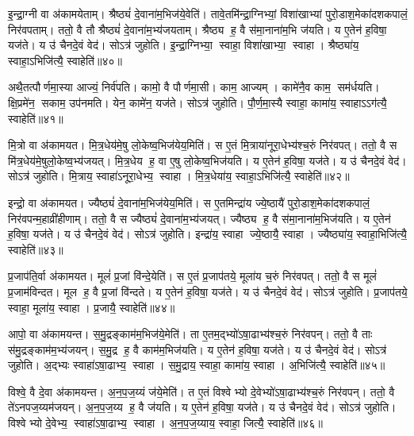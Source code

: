 इ॒न्द्रा॒ग्नी वा अ॑कामयेताम्।
श्रैष्ठ्यं॑ दे॒वाना॑म॒भिज॑ये॒वेति॑।
तावे॒तमि॑न्द्रा॒ग्निभ्यां॒ विशा॑खाभ्यां पुरो॒डाश॒मेका॑दशकपालं॒ निर॑वपताम्।
ततो॒ वै तौ श्रैष्ठ्यं॑ दे॒वाना॑म॒भ्य॑जयताम्।
श्रैष्ठ्य ह॒ वै स॑मा॒नाना॑म॒भि ज॑यति।
य ए॒तेन॑ ह॒विषा॒ यज॑ते।
य उ॑ चैनदे॒वं वेद॑।
सोऽत्र॑ जुहोति।
इ॒न्द्रा॒ग्निभ्या॒ स्वाहा॒ विशा॑खाभ्या॒ स्वाहा।
श्रैष्ठ्या॑य॒ स्वाहा॒ऽभिजि॑त्यै॒ स्वाहेति॑॥४०॥

अथै॒तत्पौर्णमा॒स्या आज्यं॒ निर्व॑पति।
कामो॒ वै पौर्णमा॒सी।
काम॒ आज्यम्।
कामे॑नै॒व काम॒ सम॑र्धयति।
क्षि॒प्रमे॑न॒ सकाम॒ उप॑नमति।
येन॒ कामे॑न॒ यज॑ते।
सोऽत्र॑ जुहोति।
पौ॒र्ण॒मा॒स्यै स्वाहा॒ कामा॑य॒ स्वाहाऽऽग॑त्यै॒ स्वाहेति॑॥४१॥\anuvakamend[अ॒ग्निः पञ्च॑दश प्र॒जाप॑ति॒ष्षोड॑श॒ सोम॒ एका॑दश रु॒द्रो दश॒र्क्षैका॑दश॒ बृह॒स्पति॒र्दश॑ देवासु॒रा नव॑ पि॒तर॒ एका॑दशार्य॒मा भगो॒ दश॑ दश सवि॒ता चतु॑र्दश॒ त्वष्टा॑ वा॒युरि॑न्द्रा॒ग्नी दश॑ द॒शाथै॒तत्पौर्णमा॒स्या अ॒ष्टौ पञ्च॑दश]

मि॒त्रो वा अ॑कामयत।
मि॒त्र॒धेय॑मे॒षु लो॒केष्व॒भिज॑येय॒मिति॑।
स ए॒तं मि॒त्राया॑नूरा॒धेभ्य॑श्च॒रुं निर॑वपत्।
ततो॒ वै स मि॑त्र॒धेय॑मे॒षुलो॒केष्व॒भ्य॑जयत्।
मि॒त्र॒धेय ह॒ वा ए॒षु लो॒केष्व॒भिज॑यति।
य ए॒तेन॑ ह॒विषा॒ यज॑ते।
य उ॑ चैनदे॒वं वेद॑।
सोऽत्र॑ जुहोति।
मि॒त्राय॒ स्वाहा॑ऽनूरा॒धेभ्य॒ स्वाहा।
मि॒त्र॒धेया॑य॒ स्वाहा॒ऽभिजि॑त्यै॒ स्वाहेति॑॥४२॥

इन्द्रो॒ वा अ॑कामयत।
ज्यैष्ठ्यं॑ दे॒वाना॑म॒भिज॑येय॒मिति॑।
स ए॒तमिन्द्रा॑य ज्ये॒ष्ठायै॑ पुरो॒डाश॒मेका॑दशकपालं॒ निर॑वपन्म॒हाव्री॑हीणाम्।
ततो॒ वै स ज्यैष्ठ्यं॑ दे॒वाना॑म॒भ्य॑जयत्।
ज्यैष्ठ्य ह॒ वै स॑मा॒नाना॑म॒भिज॑यति।
य ए॒तेन॑ ह॒विषा॒ यज॑ते।
य उ॑ चैनदे॒वं वेद॑।
सोऽत्र॑ जुहोति।
इन्द्रा॑य॒ स्वाहा ज्ये॒ष्ठायै॒ स्वाहा।
ज्यैष्ठ्या॑य॒ स्वाहा॒भिजि॑त्यै॒ स्वाहेति॑॥४३॥

प्र॒जाप॑ति॒र्वा अ॑कामयत।
मूलं॑ प्र॒जां वि॑न्दे॒येति॑।
स ए॒तं प्र॒जाप॑तये॒ मूला॑य च॒रुं निर॑वपत्।
ततो॒ वै स मूलं॑ प्र॒जाम॑विन्दत।
मूल ह॒ वै प्र॒जां वि॑न्दते।
य ए॒तेन॑ ह॒विषा॒ यज॑ते।
य उ॑ चैनदे॒वं वेद॑।
सोऽत्र॑ जुहोति।
प्र॒जाप॑तये॒ स्वाहा॒ मूला॑य॒ स्वाहा।
प्र॒जायै॒ स्वाहेति॑॥४४॥

आपो॒ वा अ॑कामयन्त।
स॒मु॒द्रङ्काम॑म॒भिज॑ये॒मेति॑।
ता ए॒तम॒द्भ्यो॑ऽषा॒ढाभ्य॑श्च॒रुं निर॑वपन्।
ततो॒ वै ताः स॑मु॒द्रङ्काम॑म॒भ्य॑जयन्।
स॒मु॒द्र ह॒ वै काम॑म॒भिज॑यति।
य ए॒तेन॑ ह॒विषा॒ यज॑ते।
य उ॑ चैनदे॒वं वेद॑।
सोऽत्र॑ जुहोति।
अ॒द्भ्यः स्वाहा॑ऽषा॒ढाभ्य॒ स्वाहा।
स॒मु॒द्राय॒ स्वाहा॒ कामा॑य॒ स्वाहा।
अ॒भिजि॑त्यै॒ स्वाहेति॑॥४५॥

विश्वे॒ वै दे॒वा अ॑कामयन्त।
अ॒न॒प॒ज॒य्यं ज॑ये॒मेति॑।
त ए॒तं विश्वेभ्यो दे॒वेभ्यो॑ऽषा॒ढाभ्य॑श्च॒रुं निर॑वपन्।
ततो॒ वै ते॑ऽनपज॒य्यम॑जयन्।
अ॒न॒प॒ज॒य्य ह॒ वै ज॑यति।
य ए॒तेन॑ ह॒विषा॒ यज॑ते।
य उ॑ चैनदे॒वं वेद॑।
सोऽत्र॑ जुहोति।
विश्वेभ्यो दे॒वेभ्य॒ स्वाहा॑ऽषा॒ढाभ्य॒ स्वाहा।
अ॒न॒प॒ज॒य्याय॒ स्वाहा॒ जित्यै॒ स्वाहेति॑॥४६॥

